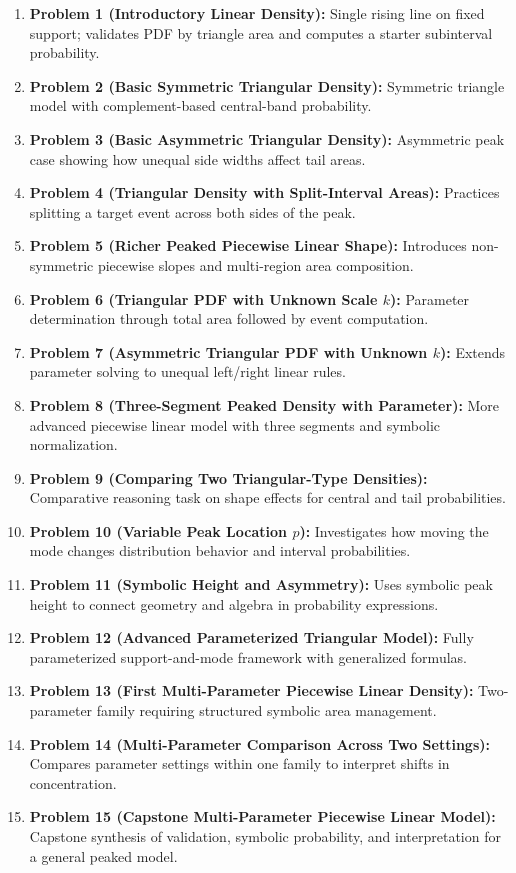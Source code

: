 \begin{enumerate}
  \item \textbf{Problem 1 (Introductory Linear Density):} Single rising line on fixed support; validates PDF by triangle area and computes a starter subinterval probability.
  \item \textbf{Problem 2 (Basic Symmetric Triangular Density):} Symmetric triangle model with complement-based central-band probability.
  \item \textbf{Problem 3 (Basic Asymmetric Triangular Density):} Asymmetric peak case showing how unequal side widths affect tail areas.
  \item \textbf{Problem 4 (Triangular Density with Split-Interval Areas):} Practices splitting a target event across both sides of the peak.
  \item \textbf{Problem 5 (Richer Peaked Piecewise Linear Shape):} Introduces non-symmetric piecewise slopes and multi-region area composition.
  \item \textbf{Problem 6 (Triangular PDF with Unknown Scale \(k\)):} Parameter determination through total area followed by event computation.
  \item \textbf{Problem 7 (Asymmetric Triangular PDF with Unknown \(k\)):} Extends parameter solving to unequal left/right linear rules.
  \item \textbf{Problem 8 (Three-Segment Peaked Density with Parameter):} More advanced piecewise linear model with three segments and symbolic normalization.
  \item \textbf{Problem 9 (Comparing Two Triangular-Type Densities):} Comparative reasoning task on shape effects for central and tail probabilities.
  \item \textbf{Problem 10 (Variable Peak Location \(p\)):} Investigates how moving the mode changes distribution behavior and interval probabilities.
  \item \textbf{Problem 11 (Symbolic Height and Asymmetry):} Uses symbolic peak height to connect geometry and algebra in probability expressions.
  \item \textbf{Problem 12 (Advanced Parameterized Triangular Model):} Fully parameterized support-and-mode framework with generalized formulas.
  \item \textbf{Problem 13 (First Multi-Parameter Piecewise Linear Density):} Two-parameter family requiring structured symbolic area management.
  \item \textbf{Problem 14 (Multi-Parameter Comparison Across Two Settings):} Compares parameter settings within one family to interpret shifts in concentration.
  \item \textbf{Problem 15 (Capstone Multi-Parameter Piecewise Linear Model):} Capstone synthesis of validation, symbolic probability, and interpretation for a general peaked model.
\end{enumerate}

